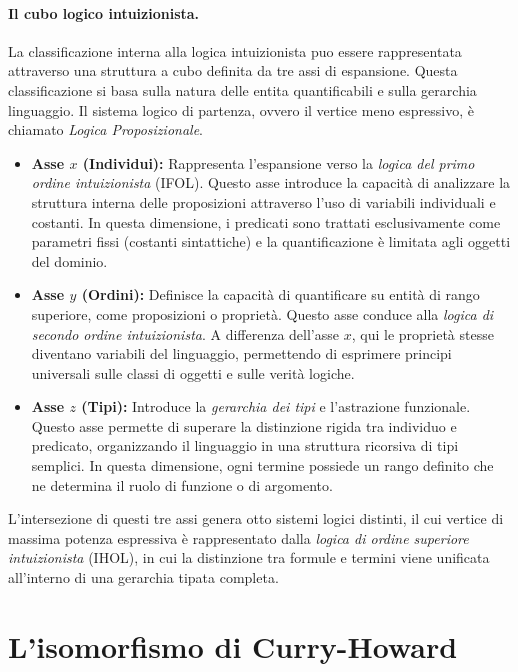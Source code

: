 \paragraph{Il cubo logico intuizionista.}
La classificazione interna alla logica intuizionista puo essere rappresentata attraverso una struttura a cubo definita da tre assi di espansione. Questa classificazione si basa sulla natura delle
entita quantificabili e sulla gerarchia linguaggio. Il sistema logico di partenza, ovvero il vertice meno espressivo, è chiamato \emph{Logica Proposizionale}.
\begin{itemize}
    \item \textbf{Asse $x$ (Individui):}  
        Rappresenta l'espansione verso la \emph{logica del primo ordine intuizionista} (IFOL). Questo asse introduce la capacità di analizzare la struttura interna 
        delle proposizioni attraverso l'uso di variabili individuali e costanti. In questa dimensione, i predicati sono trattati esclusivamente come 
        parametri fissi (costanti sintattiche) e la quantificazione è limitata agli oggetti del dominio.
    \item \textbf{Asse $y$ (Ordini):} 
        Definisce la capacità di quantificare su entità di rango superiore, come proposizioni o proprietà. Questo asse conduce alla \emph{logica di secondo ordine intuizionista}. 
        A differenza dell'asse $x$, qui le proprietà stesse diventano variabili del linguaggio, permettendo di esprimere principi universali sulle classi di oggetti 
        e sulle verità logiche.
    \item \textbf{Asse $z$ (Tipi):}
        Introduce la \emph{gerarchia dei tipi} e l'astrazione funzionale. Questo asse permette di superare la distinzione rigida tra individuo e predicato, 
        organizzando il linguaggio in una struttura ricorsiva di tipi semplici. In questa dimensione, ogni termine possiede un rango definito che ne determina 
        il ruolo di funzione o di argomento.
\end{itemize}
L'intersezione di questi tre assi genera otto sistemi logici distinti, il cui vertice di massima potenza espressiva è rappresentato dalla \emph{logica di ordine superiore intuizionista} (IHOL), 
in cui la distinzione tra formule e termini viene unificata all'interno di una gerarchia tipata completa.

\section{L'isomorfismo di Curry-Howard}
